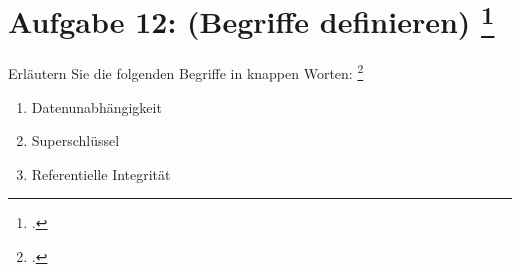 \documentclass{lehramt-informatik-minimal}
\begin{document}
\section{Aufgabe 12: (Begriffe definieren) \footcite{db:ab:7}}

Erläutern Sie die folgenden Begriffe in knappen Worten:
\footcite[aus Stex RS DB, Herbst 2015, Thema Nr. 1, Aufgabe 1]{46116:2015:09}

\begin{enumerate}


\item Datenunabhängigkeit


\item Superschlüssel


\item Referentielle Integrität
\end{enumerate}
\end{document}
